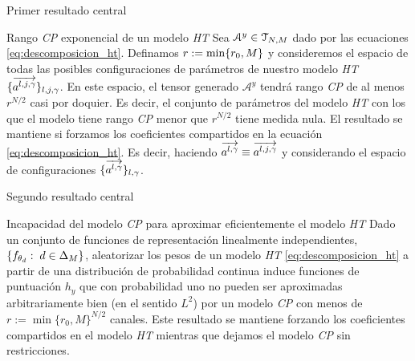 \begin{frame}{Primer resultado central}

	\begin{block}{Rango \textit{CP} exponencial de un modelo \textit{HT}}
		Sea $\mathcal{A}^y \in \mathcal{T}_{N, M}$ dado por las ecuaciones \eqref{eq:descomposicion_ht}. Definamos $r := \min \{ r_0, M \}$ y consideremos el espacio de todas las posibles configuraciones de parámetros de nuestro modelo \textit{HT} $\{  \overrightarrow{a^{l, j, \gamma}} \}_{l, j, \gamma}$. En este espacio, el tensor generado $\mathcal{A}^y$ tendrá rango \textit{CP} de al menos $r^{N/2}$ casi por doquier. Es decir, el conjunto de parámetros del modelo \textit{HT} con los que el modelo tiene rango \textit{CP} menor que $r^{N/2}$ tiene medida nula. El resultado se mantiene si forzamos los coeficientes compartidos en la ecuación \eqref{eq:descomposicion_ht}. Es decir, haciendo $\overrightarrow{a^{l, \gamma}} \equiv \overrightarrow{a^{l, j, \gamma}}$ y considerando el espacio de configuraciones $\{ \overrightarrow{a^{l, \gamma}}  \}_{l, \gamma}$.

	\end{block}


\end{frame}

\begin{frame}{Segundo resultado central}

	\begin{block}{Incapacidad del modelo \textit{CP} para aproximar eficientemente el modelo \textit{HT}}
		Dado un conjunto de funciones de representación linealmente independientes, $\{ f_{\theta_d}: \; d \in \Delta_{M} \}$, aleatorizar los pesos de un modelo \textit{HT} \eqref{eq:descomposicion_ht} a partir de una distribución de probabilidad continua induce funciones de puntuación $h_y$ que con probabilidad uno no pueden ser aproximadas arbitrariamente bien (en el sentido $L^2$) por un modelo \textit{CP} con menos de $r := \min \{r_0, M \}^{N/2}$ canales. Este resultado se mantiene forzando los coeficientes compartidos en el modelo \textit{HT} mientras que dejamos el modelo \textit{CP} sin restricciones.
	\end{block}

\end{frame}

